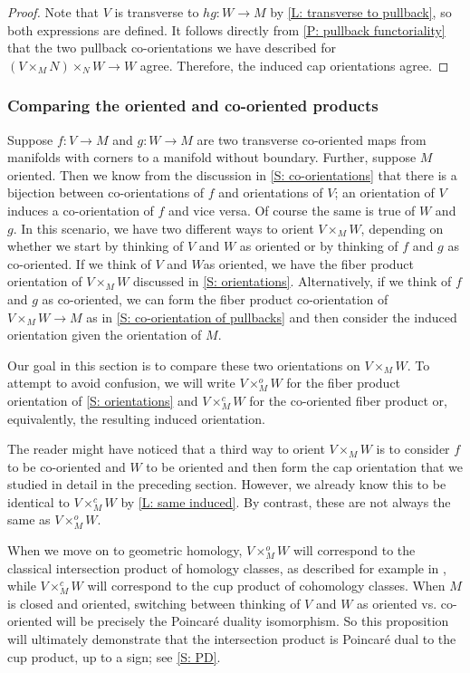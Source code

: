 \begin{proof}
	Note that $V$ is transverse to $hg \colon W \to M$ by \cref{L: transverse to pullback}, so both expressions are defined.
	It follows directly from \cref{P: pullback functoriality} that the two pullback co-orientations we have described for $(V \times_M N) \times_N W \to W$ agree.
	Therefore, the induced cap orientations agree.
\end{proof}

\subsubsection{Comparing the oriented and co-oriented products}\label{S: c vs o}

Suppose $f \colon V \to M$ and $g \colon W \to M$ are two transverse co-oriented maps from manifolds with corners to a manifold without boundary.
Further, suppose $M$ oriented.
Then we know from the discussion in \cref{S: co-orientations} that there is a bijection between co-orientations of $f$ and orientations of $V$; an orientation of $V$ induces a co-orientation of $f$ and vice versa.
Of course the same is true of $W$ and $g$.
In this scenario, we have two different ways to orient $V \times_M W$, depending on whether we start by thinking of $V$ and $W$ as oriented or by thinking of $f$ and $g$ as co-oriented.
If we think of $V$ and $W $as oriented, we have the fiber product orientation of $V \times_M W$
discussed in \cref{S: orientations}.
Alternatively, if we think of $f$ and $g$ as co-oriented, we can form the fiber product co-orientation of $V \times_M W \to M$ as in \cref{S: co-orientation of pullbacks} and then consider the induced orientation given the orientation of $M$.

Our goal in this section is to compare these two orientations on $V \times_M W$.
To attempt to avoid confusion, we will write $V \times_M ^oW$ for the fiber product orientation of \cref{S: orientations} and $V \times_M ^cW$ for the co-oriented fiber product or, equivalently, the resulting induced orientation.

The reader might have noticed that a third way to orient $V \times_M W$ is to consider $f$ to be co-oriented and $W$ to be oriented and then form the cap orientation that we studied in detail in the preceding section.
However, we already know this to be identical to $V \times_M ^cW$ by \cref{L: same induced}.
By contrast, these are not always the same as $V \times_M ^oW$.

When we move on to geometric homology, $V \times_M ^oW$ will correspond to the classical intersection product of homology classes, as described for example in \cite[Section VI.11]{Bred97}, while $V \times_M ^cW$ will correspond to the cup product of cohomology classes.
When $M$ is closed and oriented, switching between thinking of $V$ and $W$ as oriented vs. co-oriented will be precisely the Poincar\'e duality isomorphism.
So this proposition will ultimately demonstrate that the intersection product is Poincar\'e dual to the cup product, up to a sign; see \cref{S: PD}.

